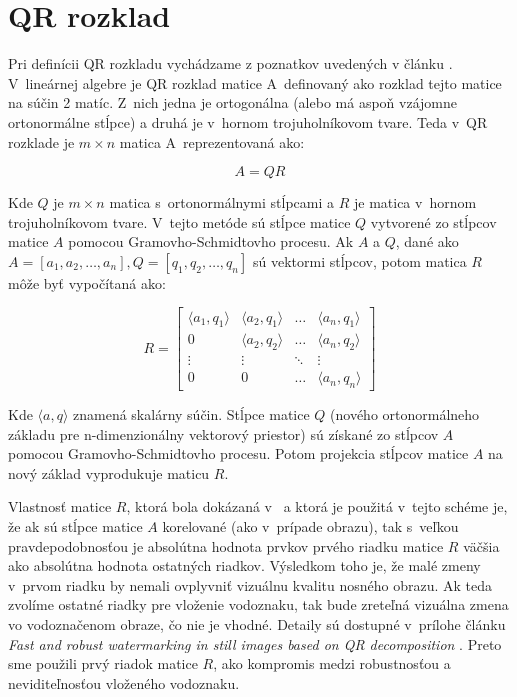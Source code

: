 \section{QR rozklad}
Pri definícii QR rozkladu vychádzame z poznatkov uvedených v článku \cite{QRdecomposition}.
V~lineárnej algebre je QR rozklad matice A~definovaný ako rozklad tejto matice na súčin 2 matíc. Z~nich jedna je ortogonálna (alebo má aspoň vzájomne ortonormálne stĺpce) a druhá je v~hornom trojuholníkovom tvare. Teda v~QR rozklade je $m \times n$ matica A~reprezentovaná ako:

\begin{equation}
A = QR
\end{equation}

Kde $Q$ je $m \times n$ matica s~ortonormálnymi stĺpcami a $R$ je matica v~hornom trojuholníkovom tvare. V~tejto metóde sú stĺpce matice $Q$ vytvorené zo stĺpcov matice $A$ pomocou Gramovho-Schmidtovho procesu. Ak $A$ a $Q$, dané ako $A=[a_1, a_2, \dots, a_n ], Q=[q_1, q_2, \dots, q_n ] $ sú vektormi stĺpcov, potom matica $R$ môže byť vypočítaná ako:

\begin{equation}
R = \begin{bmatrix} 
\langle a_1, q_1 \rangle & \langle a_2, q_1 \rangle & \dots & \langle a_n, q_1 \rangle \\
0 & \langle a_2, q_2 \rangle & \dots & \langle a_n, q_2 \rangle \\
\vdots & \vdots & \ddots & \vdots \\
0 & 0 & \dots & \langle a_n, q_n \rangle
\end{bmatrix}
\end{equation}

Kde $\langle a,q\rangle$ znamená skalárny súčin. Stĺpce matice $Q$ (nového ortonormálneho základu pre n-dimenzionálny vektorový priestor) sú získané zo stĺpcov $A$ pomocou Gramovho-Schmidtovho procesu. Potom projekcia stĺpcov matice $A$ na nový základ vyprodukuje maticu $R$.

Vlastnosť matice $R$, ktorá bola dokázaná v~\cite{QRdecomposition} a ktorá je použitá v~tejto schéme je, že ak sú stĺpce matice $A$ korelované (ako v~prípade obrazu), tak s~veľkou pravdepodobnosťou je absolútna hodnota prvkov prvého riadku matice $R$ väčšia ako absolútna hodnota ostatných riadkov. Výsledkom toho je, že malé zmeny v~prvom riadku by nemali ovplyvniť vizuálnu kvalitu nosného obrazu. Ak teda zvolíme ostatné riadky pre vloženie vodoznaku, tak bude zreteľná vizuálna zmena vo vodoznačenom obraze, čo nie je vhodné. Detaily sú dostupné v~prílohe článku {\it Fast and robust watermarking in still images based on QR decomposition} \cite{QRdecomposition}. Preto sme použili prvý riadok matice $R$, ako kompromis medzi robustnosťou a neviditeľnosťou vloženého vodoznaku.


